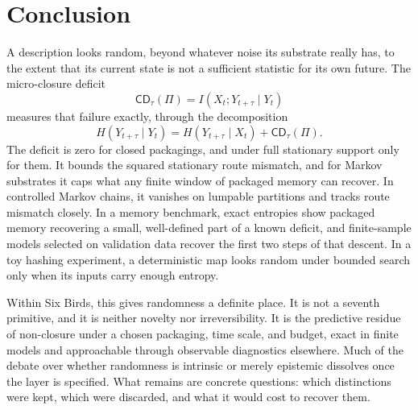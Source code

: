 \section{Conclusion}\label{sec:conclusion}

A description looks random, beyond whatever noise its substrate really has, to the extent that its current state is not a sufficient statistic for its own future. The micro-closure deficit
\[
\mathsf{CD}_\tau(\Pi)=I(X_t;Y_{t+\tau}\mid Y_t)
\]
measures that failure exactly, through the decomposition
\[
H(Y_{t+\tau}\mid Y_t)=H(Y_{t+\tau}\mid X_t)+\mathsf{CD}_\tau(\Pi).
\]
The deficit is zero for closed packagings, and under full stationary support only for them. It bounds the squared stationary route mismatch, and for Markov substrates it caps what any finite window of packaged memory can recover. In controlled Markov chains, it vanishes on lumpable partitions and tracks route mismatch closely. In a memory benchmark, exact entropies show packaged memory recovering a small, well-defined part of a known deficit, and finite-sample models selected on validation data recover the first two steps of that descent. In a toy hashing experiment, a deterministic map looks random under bounded search only when its inputs carry enough entropy.

Within Six Birds, this gives randomness a definite place. It is not a seventh primitive, and it is neither novelty nor irreversibility. It is the predictive residue of non-closure under a chosen packaging, time scale, and budget, exact in finite models and approachable through observable diagnostics elsewhere. Much of the debate over whether randomness is intrinsic or merely epistemic dissolves once the layer is specified. What remains are concrete questions: which distinctions were kept, which were discarded, and what it would cost to recover them.

